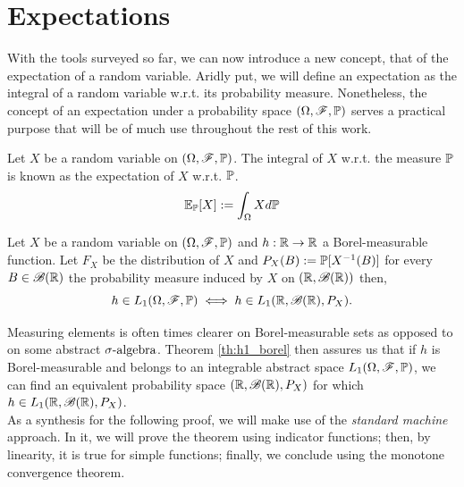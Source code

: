 \documentclass[../TGMAFFIRO.tex]{subfiles}
\begin{document}
\section{Expectations}
With the tools surveyed so far, we can now introduce a new concept, that of the expectation of a random variable. Aridly put, we will define an expectation as the integral of a random variable w.r.t. its probability measure. Nonetheless, the concept of an expectation under a probability space $(\Omega, \mathscr{F}, \mathbb{P})$ serves a practical purpose that will be of much use throughout the rest of this work.

\begin{definition}
	Let $X$ be a random variable on $(\Omega, \mathscr{F}, \mathbb{P})$. The integral of $X$ w.r.t. the measure $\mathbb{P}$ is known as the expectation of $X$ w.r.t. $\mathbb{P}$. 
	\begin{equation}
		\mathbb{E}_{\mathbb{P}}[X] := \int_\Omega X d\mathbb{P}
	\end{equation}
\end{definition}


\begin{theorem}\label{th:h1_borel}
		Let $X$ be a random variable on $(\Omega, \mathscr{F}, \mathbb{P})$ and $h: \mathbb{R} \to \mathbb{R}$ a Borel-measurable function. Let $F_X$ be the distribution of $X$ and $P_X(B):= \mathbb{P}[X^{-1}(B)]$ for every $B \in \mathscr{B}(\mathbb{R})$ the probability measure induced by $X$ on $(\mathbb{R}, \mathscr{B}(\mathbb{R}))$ then,
		\begin{equation}
			h \in L_1(\Omega, \mathscr{F}, \mathbb{P}) \iff h \in L_1(\mathbb{R}, \mathscr{B}(\mathbb{R}), P_X).
		\end{equation}
\end{theorem}

Measuring elements is often times clearer on Borel-measurable sets as opposed to on some abstract $\sigma\text{-algebra}$. Theorem \ref{th:h1_borel} then assures us that if $h$ is Borel-measurable and belongs to an integrable abstract space $L_1(\Omega, \mathscr{F}, \mathbb{P})$, we can find an equivalent probability space $(\mathbb{R}, \mathscr{B}(\mathbb{R}), P_X)$ for which $h \in L_1(\mathbb{R}, \mathscr{B}(\mathbb{R}), P_X)$.\\

As a synthesis for the following proof, we will make use of the \textit{standard machine} approach. In it, we will prove the theorem using indicator functions; then, by linearity, it is true for simple functions; finally, we conclude using the monotone convergence theorem.\\
\end{document}

